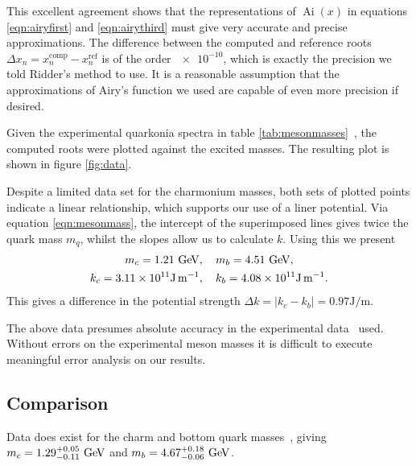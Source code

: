 \documentclass[]{article}
\renewcommand{\mod}[1]{\ensuremath{\lvert {#1} \rvert}}
\newcommand{\Ai}[1]{\ensuremath{\operatorname{Ai}({#1})}}
\begin{document}
This excellent agreement shows that the representations of \Ai{x} in equations \ref{eqn:airyfirst} and \ref{eqn:airythird} must give very accurate and precise approximations. The difference between the computed and reference roots $\Delta x_{n} = x_{n}^{\mathrm{comp}} - x_{n}^{\mathrm{ref}}$ is of the order $\num{e-10}$, which is exactly the precision we told Ridder's method to use. It is a reasonable assumption that the approximations of Airy's function we used are capable of even more precision if desired.\footnotemark


Given the experimental quarkonia spectra in table \ref{tab:mesonmasses}~\cite{ref:gdaniell}, the computed roots were plotted against the excited masses. The resulting plot is shown in figure \ref{fig:data}.

Despite a limited data set for the charmonium masses, both sets of plotted points indicate a linear relationship, which supports our use of a liner potential. Via equation \ref{eqn:mesonmass}, the intercept of the superimposed lines gives twice the quark mass $m_{q}$, whilst the slopes allow us to calculate $k$. Using this we present
\begin{align*}
m_{c} = 1.21\GeV&,\quad m_{b} = 4.51\GeV,\\
k_{c} = \num{3.11e11}\si{\joule\per\metre}&,\quad k_{b} = \num{4.08e11}\si{\joule\per\metre}.
\end{align*}
This gives a difference in the potential strength $\Delta k = \mod{k_{c} - k_{b}} = 0.97\si{\joule\per\metre}$.

The above data presumes absolute accuracy in the experimental data~\cite{ref:gdaniell} used. Without errors on the experimental meson masses it is difficult to execute meaningful error analysis on our results.

\subsection{Comparison}

Data does exist for the charm and bottom quark masses~\cite{ref:pdg}, giving $m_{c} = 1.29^{+0.05}_{-0.11}\GeV$ and $m_{b} = 4.67^{+0.18}_{-0.06}\GeV$.\footnotemark
\end{document}
